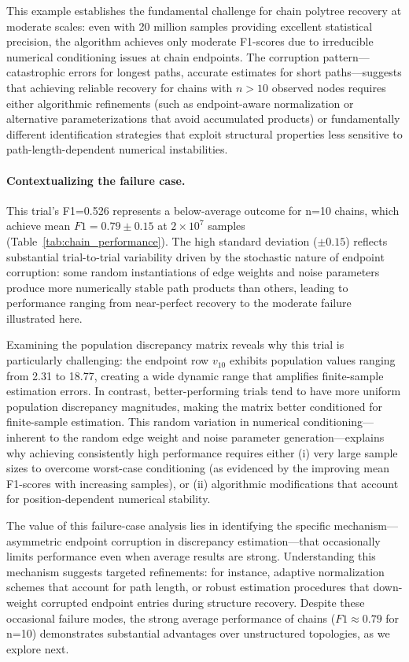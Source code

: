 \documentclass[11pt,a4paper]{article}
\numberwithin{equation}{section}
\begin{document}
This example establishes the fundamental challenge for chain polytree recovery at moderate scales: even with 20 million samples providing excellent statistical precision, the algorithm achieves only moderate F1-scores due to irreducible numerical conditioning issues at chain endpoints. The corruption pattern—catastrophic errors for longest paths, accurate estimates for short paths—suggests that achieving reliable recovery for chains with $n > 10$ observed nodes requires either algorithmic refinements (such as endpoint-aware normalization or alternative parameterizations that avoid accumulated products) or fundamentally different identification strategies that exploit structural properties less sensitive to path-length-dependent numerical instabilities.

\paragraph{Contextualizing the failure case.} This trial's F1=0.526 represents a below-average outcome for n=10 chains, which achieve mean $F1 = 0.79 \pm 0.15$ at $2 \times 10^7$ samples (Table~\ref{tab:chain_performance}). The high standard deviation ($\pm 0.15$) reflects substantial trial-to-trial variability driven by the stochastic nature of endpoint corruption: some random instantiations of edge weights and noise parameters produce more numerically stable path products than others, leading to performance ranging from near-perfect recovery to the moderate failure illustrated here.

Examining the population discrepancy matrix reveals why this trial is particularly challenging: the endpoint row $v_{10}$ exhibits population values ranging from 2.31 to 18.77, creating a wide dynamic range that amplifies finite-sample estimation errors. In contrast, better-performing trials tend to have more uniform population discrepancy magnitudes, making the matrix better conditioned for finite-sample estimation. This random variation in numerical conditioning—inherent to the random edge weight and noise parameter generation—explains why achieving consistently high performance requires either (i) very large sample sizes to overcome worst-case conditioning (as evidenced by the improving mean F1-scores with increasing samples), or (ii) algorithmic modifications that account for position-dependent numerical stability.

The value of this failure-case analysis lies in identifying the specific mechanism—asymmetric endpoint corruption in discrepancy estimation—that occasionally limits performance even when average results are strong. Understanding this mechanism suggests targeted refinements: for instance, adaptive normalization schemes that account for path length, or robust estimation procedures that down-weight corrupted endpoint entries during structure recovery. Despite these occasional failure modes, the strong average performance of chains ($F1 \approx 0.79$ for n=10) demonstrates substantial advantages over unstructured topologies, as we explore next.
\end{document}
